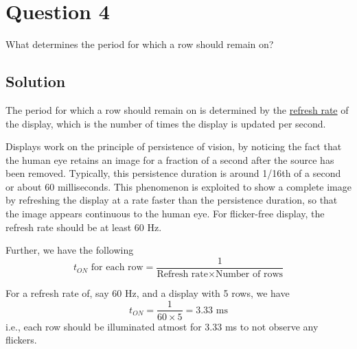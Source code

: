 \section*{Question 4}

What determines the period for which a row should remain on?

\subsection*{Solution}

The period for which a row should remain on is determined by the \underline{refresh rate} of the display, which is the number of times the display is updated per second.

Displays work on the principle of persistence of vision, by noticing the fact that the human eye retains an image for a fraction of a second after the source has been removed.
Typically, this persistence duration is around 1/16th of a second or about 60 milliseconds.
This phenomenon is exploited to show a complete image by refreshing the display at a rate faster than the persistence duration, so that the image appears continuous to the human eye.
For flicker-free display, the refresh rate should be at least 60 Hz.

Further, we have the following
\[
    t_{ON} \text{ for each row}
    =
    \frac{1}{\text{Refresh rate} \times \text{Number of rows}}
\]

For a refresh rate of, say 60 Hz, and a display with 5 rows, we have
\[
    t_{ON} = \frac{1}{60 \times 5} = 3.33 \text{ ms}
\]
i.e., each row should be illuminated atmost for 3.33 ms to not observe any flickers.
